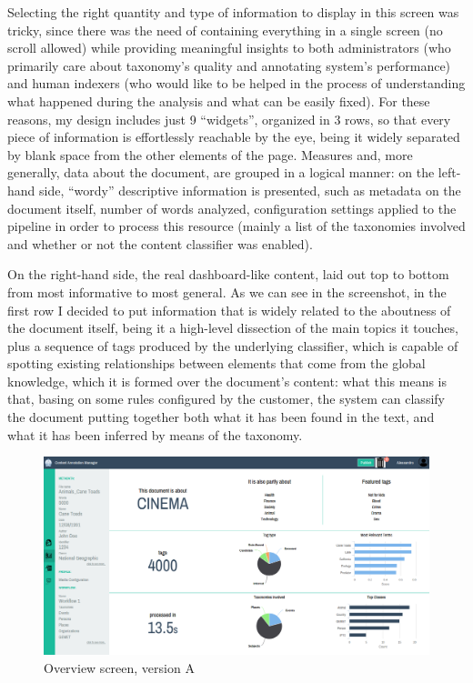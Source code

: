 \documentclass[12pt,svgnames]{memoir}
\begin{document}
Selecting the right quantity and type of information to display in this
screen was tricky, since there was the need of containing everything in
a single screen (no scroll allowed) while providing meaningful insights
to both administrators (who primarily care about taxonomy's quality and
annotating system's performance) and human indexers (who would like to
be helped in the process of understanding what happened during the
analysis and what can be easily fixed). For these reasons, my design
includes just 9 ``widgets'', organized in 3 rows, so that every piece of
information is effortlessly reachable by the eye, being it widely
separated by blank space from the other elements of the page. Measures
and, more generally, data about the document, are grouped in a logical
manner: on the left-hand side, ``wordy'' descriptive information is
presented, such as metadata on the document itself, number of words
analyzed, configuration settings applied to the pipeline in order to
process this resource (mainly a list of the taxonomies involved and
whether or not the content classifier was enabled).

On the right-hand side, the real dashboard-like content, laid out top to
bottom from most informative to most general. As we can see in the
screenshot, in the first row I decided to put information that is widely
related to the aboutness of the document itself, being it a high-level
dissection of the main topics it touches, plus a sequence of tags
produced by the underlying classifier, which is capable of spotting
existing relationships between elements that come from the global
knowledge, which it is formed over the document's content: what this
means is that, basing on some rules configured by the customer, the
system can classify the document putting together both what it has been
found in the text, and what it has been inferred by means of the
taxonomy.

\begin{figure}[htbp]
\centering
\includegraphics{./src/img/overview-A.png}
\caption{Overview screen, version A}
\end{figure}
\end{document}
